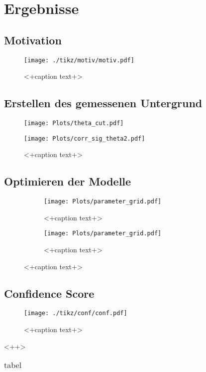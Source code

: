 \chapter{Ergebnisse}
\section{Motivation}
\begin{figure}[H]
  \centering
  \texttt{[image: ./tikz/motiv/motiv.pdf]}
  \caption{<+caption text+>}
  \label{fig:<+label+>}
\end{figure}

\section{Erstellen des gemessenen Untergrund}
\begin{figure}[H]
  \centering
  \texttt{[image: Plots/theta\_cut.pdf]}
  \caption{}
  \label{fig:}
\end{figure}

\begin{figure}[H]
  \centering
  \texttt{[image: Plots/corr\_sig\_theta2.pdf]}
  \caption{<+caption text+>}
  \label{fig:<+label+>}
\end{figure}

\section{Optimieren der Modelle}
\begin{figure}
  \begin{subfigure}[b]{0.5\textwidth}
  \texttt{[image: Plots/parameter\_grid.pdf]}
  \caption{<+caption text+>}
  \label{fig:<+label+>}
\end{subfigure}
\begin{subfigure}[b]{0.5\textwidth}
  \texttt{[image: Plots/parameter\_grid.pdf]}
  \caption{<+caption text+>}
  \label{fig:<+label+>}
\end{subfigure}
\end{figure}

\section{Confidence Score}
\begin{figure}[H]
  \centering
  \texttt{[image: ./tikz/conf/conf.pdf]}
  \caption{<+caption text+>}
  \label{fig:<+label+>}
\end{figure}<++>
\begin{table}
  \centering
  \caption{tabel}
  \begin{tabular}{s s s}
	\toprule

	\midrule

	\bottomrule
  \end{tabular}
  \label{tab:<+label+>}
\end{table}


